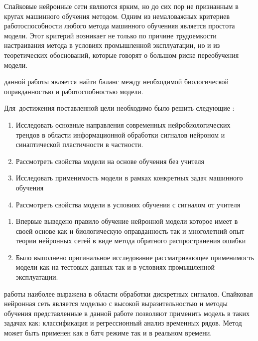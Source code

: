
{\actuality} Спайковые нейронные сети являются ярким, но до сих пор не признанным в кругах машинного обучения методом. Одним из немаловажных критериев работоспособности любого метода машинного обученияя является простота модели. Этот критерий возникает не только по причине трудоемкости настраивания метода в условиях промышленной эксплуатации, но и из теоретических обоснований, которые говорят о большом риске переобучения модели. 


{\aim} данной работы является найти баланс между необходимой биологической оправданностью и работоспобностью модели.

Для~достижения поставленной цели необходимо было решить следующие {\tasks}:
\begin{enumerate}
  \item Исследовать основные направления современных нейробиологических трендов в области информационной обработки сигналов нейроном и синаптической пластичности в частности.
  \item Рассмотреть свойства модели на основе обучения без учителя
  \item Исследовать применимость модели в рамках конкретных задач машинного обучения
  \item Рассмотреть свойства модели в условиях обучения с сигналом от учителя
\end{enumerate}


{\novelty}
\begin{enumerate}
  \item Впервые выведено правило обучение нейронной модели которое имеет в своей основе как и биологическую оправданность так и многолетний опыт теории нейронных сетей в виде метода обратного распространения ошибки
  \item Было выполнено оригинальное исследование рассматривающее применимость модели как на тестовых данных так и в условиях промышленной эксплуатации.
\end{enumerate}

{\influence} работы наиболее выражена в области обработки дискретных сигналов. Спайковая нейронная сеть является моделью с высокой выразительностью и методы обучения представленные в данной работе позволяют применить модель в таких задачах как: классификация и регрессионный анализ временных рядов. Метод может быть применен как в батч режиме так и в реальном времени. 

